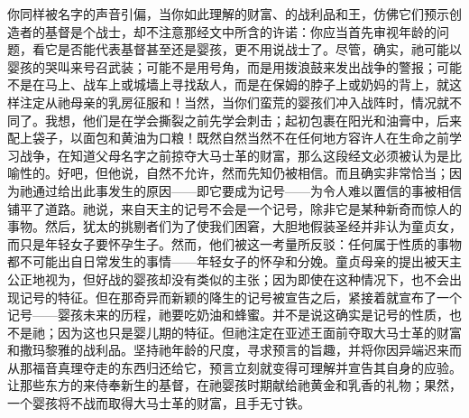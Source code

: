 你同样被名字的声音引偏，当你如此理解的财富、的战利品和王，仿佛它们预示创造者的基督是个战士，却不注意那经文中所含的许诺：你应当首先审视年龄的问题，看它是否能代表基督甚至还是婴孩，更不用说战士了。尽管，确实，祂可能以婴孩的哭叫来号召武装；可能不是用号角，而是用拨浪鼓来发出战争的警报；可能不是在马上、战车上或城墙上寻找敌人，而是在保姆的脖子上或奶妈的背上，就这样注定从祂母亲的乳房征服和！当然，当你们蛮荒的婴孩们冲入战阵时，情况就不同了。我想，他们是在学会撕裂之前先学会刺击；起初包裹在阳光和油膏中，后来配上袋子，以面包和黄油为口粮！既然自然当然不在任何地方容许人在生命之前学习战争，在知道父母名字之前掠夺大马士革的财富，那么这段经文必须被认为是比喻性的。好吧，但他说，自然不允许，然而先知仍被相信。而且确实非常恰当；因为祂通过给出此事发生的原因——即它要成为记号——为令人难以置信的事被相信铺平了道路。祂说，来自天主的记号不会是一个记号，除非它是某种新奇而惊人的事物。然后，犹太的挑剔者们为了使我们困窘，大胆地假装圣经并非认为童贞女，而只是年轻女子要怀孕生子。然而，他们被这一考量所反驳：任何属于性质的事物都不可能出自日常发生的事情——年轻女子的怀孕和分娩。童贞母亲的提出被天主公正地视为，但好战的婴孩却没有类似的主张；因为即使在这种情况下，也不会出现记号的特征。但在那奇异而新颖的降生的记号被宣告之后，紧接着就宣布了一个记号——婴孩未来的历程，祂要吃奶油和蜂蜜。并不是说这确实是记号的性质，也不是祂；因为这也只是婴儿期的特征。但祂注定在亚述王面前夺取大马士革的财富和撒玛黎雅的战利品。坚持祂年龄的尺度，寻求预言的旨趣，并将你因异端迟来而从那福音真理夺走的东西归还给它，预言立刻就变得可理解并宣告其自身的应验。让那些东方的来侍奉新生的基督，在祂婴孩时期献给祂黄金和乳香的礼物；果然，一个婴孩将不战而取得大马士革的财富，且手无寸铁。\par

